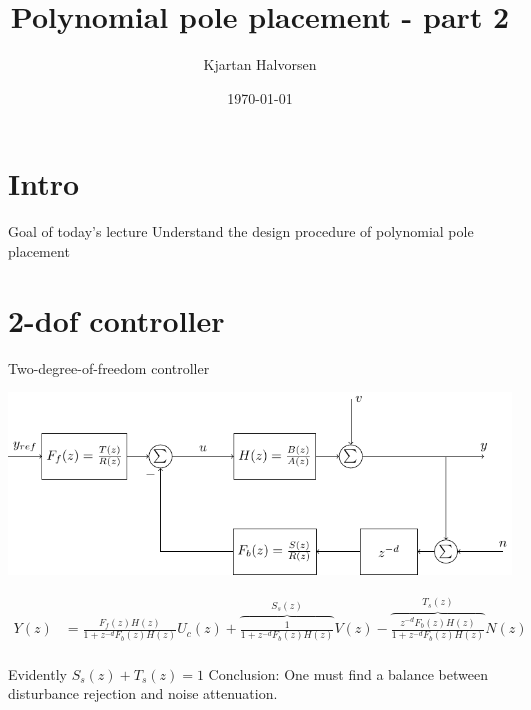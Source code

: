 \documentclass[presentation,aspectratio=169]{beamer}
\author{Kjartan Halvorsen}
\date{\today}
\title{Polynomial pole placement - part 2}
\begin{document}
\maketitle


\section{Intro}
\label{sec:org8bb9cb2}

\begin{frame}[label={sec:orgef2154c}]{Goal of today's lecture}
Understand the design procedure of polynomial pole placement
\end{frame}


\section{2-dof controller}
\label{sec:orga4e419a}

\begin{frame}[label={sec:org6dfc545}]{Two-degree-of-freedom controller}
\begin{center}
\includegraphics[width=0.7\linewidth]{../../figures/2dof-block-explicit}
\end{center}

\begin{align*}
Y(z)     &= \frac{F_f(z)H(z)}{1 + z^{-d}F_b(z)H(z)}U_c(z) + \overbrace{\frac{1}{1 + z^{-d}F_b(z)H(z)}}^{S_s(z)}V(z)  - \overbrace{\frac{z^{-d}F_b(z)H(z)}{1 + z^{-d}F_b(z)H(z)}}^{T_s(z)}N(z)\\
\end{align*}

\alert{Evidently} \(S_s(z) + T_s(z) = 1\) \alert{Conclusion:} One must find a balance between disturbance rejection and noise attenuation.
\end{frame}
\end{document}
